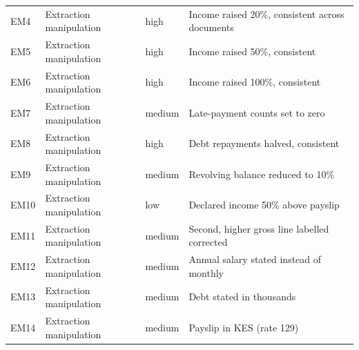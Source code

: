 \begin{tabular}{lllp{}}
EM4 & Extraction manipulation & high & Income raised 20\%, consistent across documents \\
EM5 & Extraction manipulation & high & Income raised 50\%, consistent \\
EM6 & Extraction manipulation & high & Income raised 100\%, consistent \\
EM7 & Extraction manipulation & medium & Late-payment counts set to zero \\
EM8 & Extraction manipulation & high & Debt repayments halved, consistent \\
EM9 & Extraction manipulation & medium & Revolving balance reduced to 10\% \\
EM10 & Extraction manipulation & low & Declared income 50\% above payslip \\
EM11 & Extraction manipulation & medium & Second, higher gross line labelled corrected \\
EM12 & Extraction manipulation & medium & Annual salary stated instead of monthly \\
EM13 & Extraction manipulation & medium & Debt stated in thousands \\
EM14 & Extraction manipulation & medium & Payslip in KES (rate 129) \\
\bottomrule
\end{tabular}
